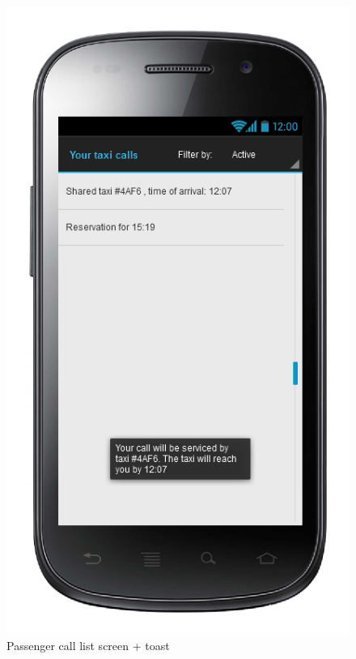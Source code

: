 \begin{center}
\begin{figure} [h]
  	  \includegraphics[scale=0.5]{ui/Passenger call list screen + toast.png}
\caption{Passenger call list screen + toast}
    
\end{figure}
\end{center}

